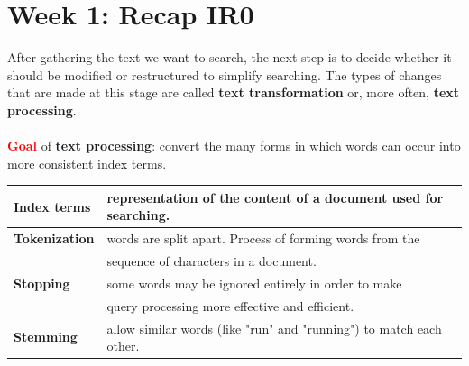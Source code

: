 \section{Week 1: Recap IR0}

After gathering the text we want to search, the next step is to decide whether it should be modified or restructured to simplify searching. The types of changes that are made at this stage are called \textbf{text transformation} or, more often, \textbf{text processing}. 
\\
\\
\textbf{\textcolor{Red}{Goal}} of \textbf{text processing}: convert the many forms in which words can occur into more consistent index terms. \\

\begin{tabular}{|l|l|}
\hline
\textbf{Index terms} & representation of the content of a document used for searching. \\
\hline
\textbf{Tokenization}  & words are split apart. Process of forming words from the \\
& sequence of characters in a document. \\
\hline
\textbf{Stopping} & some words may be ignored entirely in order to make \\ & query processing more effective and efficient. \\
\hline
\textbf{Stemming} & allow similar words (like "run" and "running") to match each other. \\
\hline
\end{tabular}
\vspace{0.25cm}

